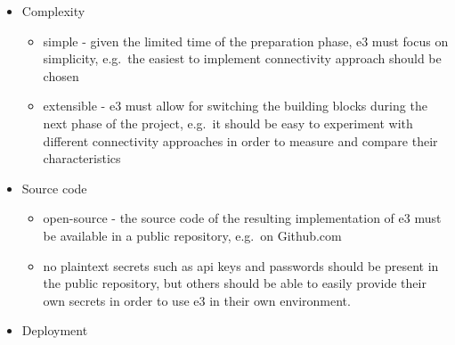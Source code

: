 \documentclass[
]{article}
\providecommand{\tightlist}{%
  \setlength{\itemsep}{0pt}\setlength{\parskip}{0pt}}
\begin{document}
\begin{itemize}
  \tightlist
  \item
        Complexity

        \begin{itemize}
          \tightlist
          \item
                simple - given the limited time of the preparation phase, \gls{e3}
                must focus on simplicity, e.g.~the easiest to implement connectivity
                approach should be chosen
          \item
                extensible - \gls{e3} must allow for switching the building blocks
                during the next phase of the project, e.g.~it should be easy to
                experiment with different connectivity approaches in order to
                measure and compare their characteristics
        \end{itemize}
  \item
        Source code

        \begin{itemize}
          \tightlist
          \item
                open-source - the source code of the resulting implementation of
                \gls{e3} must be available in a public repository, e.g.~on
                Github.com
          \item
                no plaintext secrets such as \gls{api} keys and passwords should be
                present in the public repository, but others should be able to
                easily provide their own secrets in order to use \gls{e3} in their
                own environment.
        \end{itemize}
  \item
        Deployment


\end{itemize}
\end{document}
